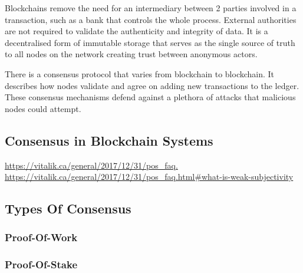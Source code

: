 Blockchains remove the need for an intermediary between 2 parties involved in a transaction, such as a bank that controls the whole process. External authorities are not required to validate the authenticity and integrity of data. It is a decentralised form of immutable storage that serves as the single source of truth to all nodes on the network creating trust between anonymous actors.

There is a consensus protocol that varies from blockchain to blockchain. It describes how nodes validate and agree on adding new transactions to the ledger. These consensus mechanisms defend against a plethora of attacks that malicious nodes could attempt.





\subsection{Consensus in Blockchain Systems}
\url{https://vitalik.ca/general/2017/12/31/pos_faq.}
\url{https://vitalik.ca/general/2017/12/31/pos_faq.html#what-is-weak-subjectivity}



\subsection{Types Of Consensus}





\subsubsection{Proof-Of-Work}





\subsubsection{Proof-Of-Stake}






